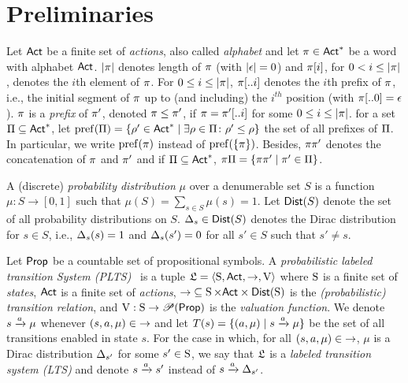\section{Preliminaries}
\label{sec:preliminaries}



Let $\Act$ be a finite set of \emph{actions}, also called
\emph{alphabet} and let $\plan\in\Act^*$ be a word with alphabet
$\Act$.  $\size{\plan}$ denotes length of $\plan$ (with
$\size{\epsilon}=0$) and $\plan[i]$, for $0<i\leq\size{\plan}$,
denotes the $i$th element of $\plan$.
%
For $0\leq i\leq\size{\plan}$, $\plan[..i]$ denotes the $i$th prefix
of $\plan$, i.e., the initial segment of $\plan$ up to (and including)
the $i^{th}$ position (with $\plan[..0] = \epsilon$).
%
$\plan$ is a \emph{prefix} of $\plan'$, denoted $\plan\leq\plan'$, if
$\plan=\plan'[..i]$ for some $0\leq i\leq\size{\plan}$. for a set
$\plans\subseteq\Act^*$, let
$\pref(\plans)=\{\rho'\in\Act^*\mid{\exists{\rho\in\plans}\colon{\rho'\leq\rho}}\}$
the set of all prefixes of $\plans$.  In particular, we write
$\pref(\plan)$ instead of $\pref(\{\plan\})$.
%
Besides, $\plan\plan'$ denotes the concatenation of $\plan$ and
$\plan'$ and if $\plans\subseteq\Act^*$,
$\plan\plans=\{\plan\plan'\mid{\plan'\in\plans}\}$.


A (discrete) \emph{probability distribution} $\mu$ over a denumerable
set $S$ is a function $\mu: S \rightarrow [0, 1] $ such that
$\mu(S) = \sum_{s \in S} \mu(s) = 1$.  Let $\Dist(S)$ denote the set
of all probability distributions on $S$.  $\Dirac_s \in \Dist(S)$
denotes the Dirac distribution for $s \in S$, i.e., $\Dirac_s(s) =1$
and $\Dirac_s(s') = 0$ for all $s' \in S$ such that $s'\neq s$.



Let $\Prop$ be a countable set of propositional symbols.
%
A \emph{probabilistic labeled transition System
(PLTS)}~\cite{Segala95} is a tuple $\model=\tup{\S,\Act,\ra,\V}$ where
$\S$ is a finite set of \emph{states}, $\Act$ is a finite set of
\emph{actions}, ${\ra}\subseteq {\S \times \Act \times \Dist(\S)}$ is
the \emph{(probabilistic) transition relation}, and
$\V:\S\to\powerset(\Prop)$ is the \emph{valuation function}.
%
We denote $s\reach{a}\mu$ whenever $(s,a,\mu)\in{\ra}$ and let
$T(s)=\{(a,\mu)\mid {s\reach{a}\mu}\}$ be the set of all transitions
enabled in state $s$.
%
For the case in which, for all $(s,a,\mu)\in{\ra}$, $\mu$ is a Dirac
distribution $\Dirac_{s'}$ for some $s'\in\S$, we say that $\model$ is
a \emph{labeled transition system (LTS)} and denote $s\reach{a}s'$
instead of $s\reach{a}\Dirac_{s'}$.


